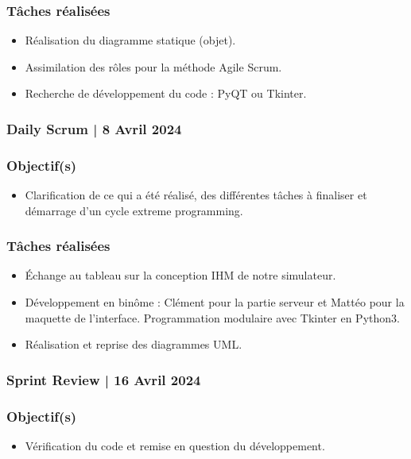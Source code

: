 	\subsubsection*{Tâches réalisées}
	\begin{itemize}
		\item Réalisation du diagramme statique (objet).
		\item Assimilation des rôles pour la méthode Agile Scrum.
		\item Recherche de développement du code : PyQT ou Tkinter.
	\end{itemize}
	
	\subsubsection{Daily Scrum | 8 Avril 2024}
	\subsubsection*{Objectif(s)}
	\begin{itemize}
		\item Clarification de ce qui a été réalisé, des différentes tâches à finaliser et démarrage d’un cycle extreme programming.
	\end{itemize}
	
	\subsubsection*{Tâches réalisées}
	\begin{itemize}
		\item Échange au tableau sur la conception IHM de notre simulateur.
		\item Développement en binôme : Clément pour la partie serveur et Mattéo pour la maquette de l’interface. Programmation modulaire avec Tkinter en Python3.
		\item Réalisation et reprise des diagrammes UML.
	\end{itemize}
	
	\subsubsection{Sprint Review | 16 Avril 2024}
	\subsubsection*{Objectif(s)}
	\begin{itemize}
		\item Vérification du code et remise en question du développement.
	\end{itemize}
	
